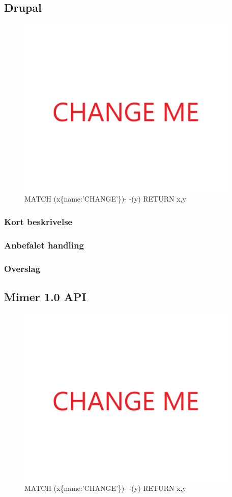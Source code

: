 \documentclass{article}
\begin{document}
\subsection{Drupal}
\begin{figure}[h]
\includegraphics[width=300pt]{CHANGE.PNG}
\caption{MATCH (x\{name:'CHANGE'\})- -(y) RETURN x,y}
\end{figure}
\subsubsection{Kort beskrivelse}
\subsubsection{Anbefalet handling}
\subsubsection{Overslag}
\subsection{Mimer 1.0 API}
\begin{figure}[h]
\includegraphics[width=300pt]{CHANGE.PNG}
\caption{MATCH (x\{name:'CHANGE'\})- -(y) RETURN x,y}
\end{figure}
\end{document}
